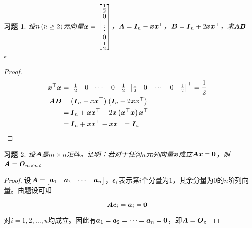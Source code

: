 \documentclass{ctexart}
\newtheorem{problem}{习题}[section]
\begin{document}
\begin{problem}
设\(n\left( n\ge2 \right)\)元向量\(\boldsymbol{x}=\begin{bmatrix}\frac12\\0\\\vdots\\0\\\frac12\end{bmatrix}\)，\(\boldsymbol{A}=\boldsymbol{I}_n-\boldsymbol{x}\boldsymbol{x}^\top\)，\(\boldsymbol{B}=\boldsymbol{I}_n+2\boldsymbol{x}\boldsymbol{x}^\top\)，求\(\boldsymbol{A}\boldsymbol{B}\)。
\end{problem}
\begin{proof}
    \begin{align*}
        \boldsymbol{x}^\top\boldsymbol{x} & =
        \begin{bmatrix}
            \frac{1}{2} & 0 & \cdots & 0 & \frac{1}{2}
        \end{bmatrix}
        \begin{bmatrix}
            \frac{1}{2} & 0 & \cdots & 0 & \frac{1}{2}
        \end{bmatrix}^\top=\frac{1}{2}                                        \\
        \boldsymbol{A}\boldsymbol{B}      & =\left( \boldsymbol{I}_n-\boldsymbol{x}\boldsymbol{x}^\top \right)\left( \boldsymbol{I}_n+2\boldsymbol{x}\boldsymbol{x}^\top \right) \\
                        & =\boldsymbol{I}_n+\boldsymbol{x}\boldsymbol{x}^\top-2\boldsymbol{x}\left( \boldsymbol{x}^\top\boldsymbol{x} \right)\boldsymbol{x}^\top \\
                        & =\boldsymbol{I}_n+\boldsymbol{x}\boldsymbol{x}^\top-\boldsymbol{x}\boldsymbol{x}^\top=\boldsymbol{I}_n
    \end{align*}
\end{proof}

\begin{problem}
设\(\boldsymbol{A}\)是\(m\times n\)矩阵。证明：若对于任何\(n\)元列向量\(\boldsymbol{x}\)成立\(\boldsymbol{A}\boldsymbol{x}=\boldsymbol{0}\)，则\(\boldsymbol{A}=\boldsymbol{O}_{m\times n}\)。
\end{problem}
\begin{proof}
    设\(\boldsymbol{A}=\begin{bmatrix}\boldsymbol{a}_1&\boldsymbol{a}_2&\cdots&\boldsymbol{a}_n\end{bmatrix}\)，\(\boldsymbol{e}_i\)表示第\(i\)个分量为\(1\)，其余分量为\(0\)的\(n\)阶列向量。由题设可知

    \begin{equation*}
        \boldsymbol{A}\boldsymbol{e}_i=\boldsymbol{a}_i=\boldsymbol{0}
    \end{equation*}

    对\(i=1,2,\dots,n\)均成立。因此有\(\boldsymbol{a}_1=\boldsymbol{a}_2=\cdots=\boldsymbol{a}_n=\boldsymbol{0}\)，即\(\boldsymbol{A}=\boldsymbol{O}\)。
\end{proof}
\end{document}
